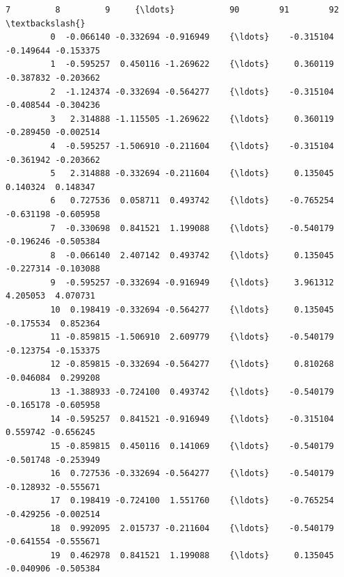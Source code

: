 \documentclass[11pt]{article}
\begin{document}
\begin{Verbatim}[commandchars=\\\{\}]
                   7         8         9     {\ldots}           90        91        92  \textbackslash{}
         0  -0.066140 -0.332694 -0.916949    {\ldots}    -0.315104 -0.149644 -0.153375   
         1  -0.595257  0.450116 -1.269622    {\ldots}     0.360119 -0.387832 -0.203662   
         2  -1.124374 -0.332694 -0.564277    {\ldots}    -0.315104 -0.408544 -0.304236   
         3   2.314888 -1.115505 -1.269622    {\ldots}     0.360119 -0.289450 -0.002514   
         4  -0.595257 -1.506910 -0.211604    {\ldots}    -0.315104 -0.361942 -0.203662   
         5   2.314888 -0.332694 -0.211604    {\ldots}     0.135045  0.140324  0.148347   
         6   0.727536  0.058711  0.493742    {\ldots}    -0.765254 -0.631198 -0.605958   
         7  -0.330698  0.841521  1.199088    {\ldots}    -0.540179 -0.196246 -0.505384   
         8  -0.066140  2.407142  0.493742    {\ldots}     0.135045 -0.227314 -0.103088   
         9  -0.595257 -0.332694 -0.916949    {\ldots}     3.961312  4.205053  4.070731   
         10  0.198419 -0.332694 -0.564277    {\ldots}     0.135045 -0.175534  0.852364   
         11 -0.859815 -1.506910  2.609779    {\ldots}    -0.540179 -0.123754 -0.153375   
         12 -0.859815 -0.332694 -0.564277    {\ldots}     0.810268 -0.046084  0.299208   
         13 -1.388933 -0.724100  0.493742    {\ldots}    -0.540179 -0.165178 -0.605958   
         14 -0.595257  0.841521 -0.916949    {\ldots}    -0.315104  0.559742 -0.656245   
         15 -0.859815  0.450116  0.141069    {\ldots}    -0.540179 -0.501748 -0.253949   
         16  0.727536 -0.332694 -0.564277    {\ldots}    -0.540179 -0.128932 -0.555671   
         17  0.198419 -0.724100  1.551760    {\ldots}    -0.765254 -0.429256 -0.002514   
         18  0.992095  2.015737 -0.211604    {\ldots}    -0.540179 -0.641554 -0.555671   
         19  0.462978  0.841521  1.199088    {\ldots}     0.135045 -0.040906 -0.505384   
         

\end{Verbatim}
\end{document}
